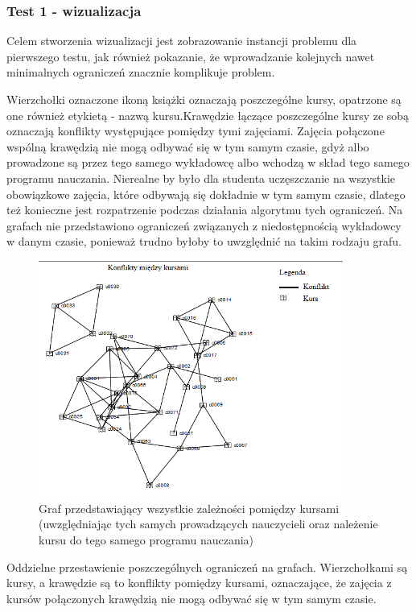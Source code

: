 \subsubsection{Test 1 - wizualizacja}
\par Celem stworzenia wizualizacji jest zobrazowanie instancji problemu dla pierwszego testu, jak również pokazanie, że wprowadzanie kolejnych nawet minimalnych ograniczeń znacznie komplikuje problem.
\par Wierzchołki oznaczone ikoną książki oznaczają poszczególne kursy, opatrzone są one również etykietą - nazwą kursu.Krawędzie łączące poszczególne kursy ze sobą oznaczają konflikty występujące pomiędzy tymi zajęciami. Zajęcia połączone wspólną krawędzią nie mogą odbywać się w tym samym czasie, gdyż albo prowadzone są przez tego samego wykładowcę albo wchodzą w skład tego samego programu nauczania. Nierealne by było dla studenta uczęszczanie na wszystkie obowiązkowe zajęcia, które odbywają się dokładnie w tym samym czasie, dlatego też konieczne jest rozpatrzenie podczas działania algorytmu tych ograniczeń. Na grafach nie przedstawiono ograniczeń związanych z niedostępnością wykładowcy w danym czasie, ponieważ trudno byłoby to uwzględnić na takim rodzaju grafu.
\begin{figure}[H]
  \centering
    \includegraphics[width=10cm]{test1.PNG}
      \caption{Graf przedstawiający wszystkie zależności pomiędzy kursami (uwzględniając tych samych prowadzących nauczycieli oraz należenie kursu do tego samego programu nauczania) }
\end{figure}
Oddzielne przestawienie poszczególnych ograniczeń na grafach. Wierzchołkami są kursy, a krawędzie są to konflikty pomiędzy kursami, oznaczające, że zajęcia z kursów połączonych krawędzią nie mogą odbywać się w tym samym czasie.

